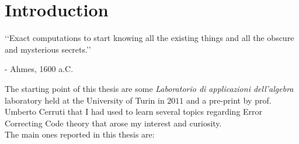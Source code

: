 

\chapter*{Introduction}

\begin{flushright}
\lq\lq Exact computations to start knowing all the existing things and all the obscure and mysterious secrets.\rq\rq
\vspace*{0.3cm}

- Ahmes, 1600 a.C.
\end{flushright}

\vspace*{0.6cm}

The starting point of this thesis are some \emph{Laboratorio di applicazioni dell'algebra} laboratory held at the University of Turin in $2011$ and a pre-print by prof. Umberto Cerruti \cite{cerruti} that I had used to learn several topics regarding Error Correcting Code theory that arose my interest and curiosity.\\
The main ones reported in this thesis are:
